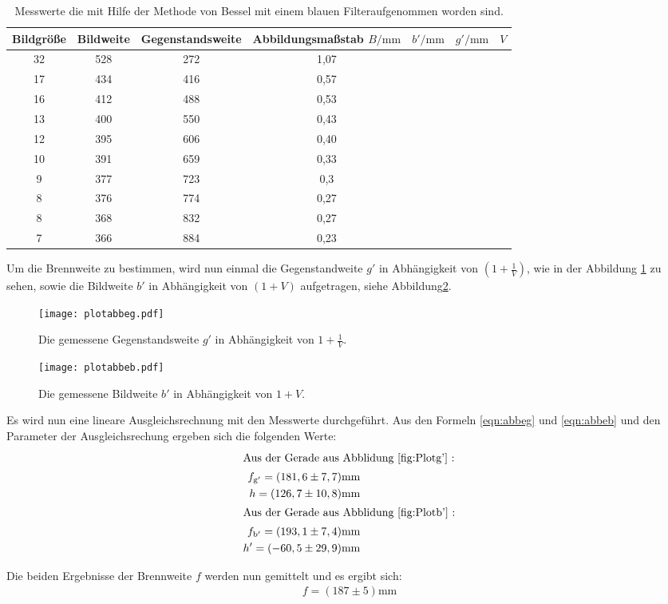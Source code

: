 \begin{table}
    \centering
    \caption{Messwerte die mit Hilfe der Methode von Bessel mit einem blauen Filteraufgenommen worden sind.}
    \label{tab:blau}
    \begin{tabular}{c c c c c c c}
    \toprule
    Bildgröße  & Bildweite &Gegenstandsweite & Abbildungsmaßstab
     $B/\si{\milli\meter}$ &$b'/\si{\milli\meter}$ & $g'/\si{\milli\meter}$ &$V$\\
    \midrule
    32  &  528  &  272  & 1,07\\
    17  &  434  &  416  & 0,57\\
    16  &  412  &  488  & 0,53\\
    13  &  400  &  550  & 0,43\\
    12  &  395  &  606  & 0,40\\
    10  &  391  &  659  & 0,33\\
    9   &  377  &  723  & 0,3\\
    8   &  376  &  774  & 0,27\\
    8   &  368  &  832  & 0,27\\
    7   &  366  &  884  & 0,23\\
    \bottomrule
  \end{tabular}
\end{table}
\FloatBarrier
Um die Brennweite zu bestimmen, wird nun einmal
die Gegenstandweite $g'$ in Abhängigkeit von
  $(1+ \frac{1}{V})$, wie in der  Abbildung \ref{fig:Plotg'} zu sehen,
sowie die Bildweite $b'$ in Abhängigkeit von
$(1+V)$ aufgetragen, siehe Abbildung\ref{fig:Plotb'}.


\begin{figure}
  \centering
  \texttt{[image: plotabbeg.pdf]}
  \caption{Die gemessene Gegenstandsweite $g'$ in Abhängigkeit von $1+\frac{1}{V}$.}
  \label{fig:Plotg'}
\end{figure}

\begin{figure}
 \centering
 \texttt{[image: plotabbeb.pdf]}
 \caption{Die gemessene Bildweite $b'$ in Abhängigkeit von $1+V$.}
 \label{fig:Plotb'}
\end{figure}
\FloatBarrier

Es wird nun eine lineare Ausgleichsrechnung mit den Messwerte durchgeführt.
Aus den Formeln  \eqref{eqn:abbeg} und \eqref{eqn:abbeb} und den Parameter der
Ausgleichsrechung ergeben sich die folgenden Werte:
\begin{align*}
\intertext{Aus der Gerade aus Abblidung \ref{fig:Plotg'} :}
  f_\mathrm{g'}=(181,6\pm7,7)\si{\milli\meter} \\
  h=(126,7\pm10,8)\si{\milli\meter} \\
\intertext{Aus der Gerade aus Abblidung \ref{fig:Plotb'} :}
f_\mathrm{b'}=(193,1\pm7,4)\si{\milli\meter} \\
  h'=(-60,5\pm29,9)\si{\milli\meter} \\
\end{align*}

Die beiden Ergebnisse der Brennweite $f$
werden nun gemittelt und es ergibt sich:
\begin{align*}
  f=(187\pm5)\si{\milli\meter}
\end{align*}
